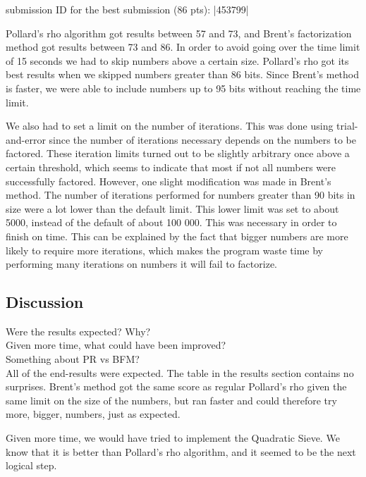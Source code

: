 \documentclass[paper=a4, fontsize=11pt,numbers=endperiod]{scrartcl} %
\numberwithin{equation}{section} %
\numberwithin{figure}{section} %
\numberwithin{table}{section} %
\begin{document}
    submission ID for the best submission (86 pts): |453799|

Pollard's rho algorithm got results between 57 and 73, and Brent's factorization method got results between 73 and 86.
In order to avoid going over the time limit of 15 seconds we had to skip numbers above a certain size. Pollard's rho got its best results when we skipped numbers greater than 86 bits. Since Brent's method is faster, we were able to include numbers up to 95 bits without reaching the time limit. 

We also had to set a limit on the number of iterations. This was done using trial-and-error since the number of iterations necessary depends on the numbers to be factored. These iteration limits turned out to be slightly arbitrary once above a certain threshold, which seems to indicate that most if not all numbers were successfully factored. However, one slight modification was made in Brent's method. The number of iterations performed for numbers greater than 90 bits in size were a lot lower than the default limit. This lower limit was set to about 5000, instead of the default of about 100 000. This was necessary in order to finish on time. This can be explained by the fact that bigger numbers are more likely to require more iterations, which makes the program waste time by performing many iterations on numbers it will fail to factorize.



\subsection{Discussion}
Were the results expected? Why?\\
Given more time, what could have been improved?\\
Something about PR vs BFM?\\

All of the end-results were expected. The table in the results section contains no surprises.
Brent's method got the same score as regular Pollard's rho given the same limit on the size of the numbers, but ran faster and could therefore try more, bigger, numbers, just as expected.


Given more time, we would have tried to implement the Quadratic Sieve. We know that it is better than Pollard's rho algorithm, and it seemed to be the next logical step. 
\end{document}
